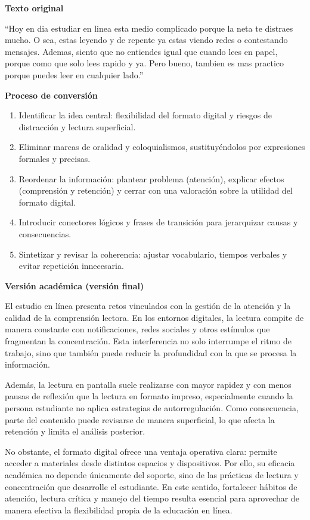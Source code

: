 \documentclass[
	spanish,
	letterpaper, oneside
]{article}
\begin{document}
\textbf{Texto original}

``Hoy en dia estudiar en linea esta medio complicado porque la neta te distraes mucho. O sea, estas leyendo y de repente ya estas viendo redes o contestando mensajes. Ademas, siento que no entiendes igual que cuando lees en papel, porque como que solo lees rapido y ya. Pero bueno, tambien es mas practico porque puedes leer en cualquier lado.''

\textbf{Proceso de conversi\'on}
\begin{enumerate}
	\item Identificar la idea central: flexibilidad del formato digital y riesgos de distracci\'on y lectura superficial.
	\item Eliminar marcas de oralidad y coloquialismos, sustituy\'endolos por expresiones formales y precisas.
	\item Reordenar la informaci\'on: plantear problema (atenci\'on), explicar efectos (comprensi\'on y retenci\'on) y cerrar con una valoraci\'on sobre la utilidad del formato digital.
	\item Introducir conectores l\'ogicos y frases de transici\'on para jerarquizar causas y consecuencias.
	\item Sintetizar y revisar la coherencia: ajustar vocabulario, tiempos verbales y evitar repetici\'on innecesaria.
\end{enumerate}

\textbf{Versi\'on acad\'emica (versi\'on final)}

El estudio en l\'inea presenta retos vinculados con la gesti\'on de la atenci\'on y la calidad de la comprensi\'on lectora. En los entornos digitales, la lectura compite de manera constante con notificaciones, redes sociales y otros est\'imulos que fragmentan la concentraci\'on. Esta interferencia no solo interrumpe el ritmo de trabajo, sino que tambi\'en puede reducir la profundidad con la que se procesa la informaci\'on.

Adem\'as, la lectura en pantalla suele realizarse con mayor rapidez y con menos pausas de reflexi\'on que la lectura en formato impreso, especialmente cuando la persona estudiante no aplica estrategias de autorregulaci\'on. Como consecuencia, parte del contenido puede revisarse de manera superficial, lo que afecta la retenci\'on y limita el an\'alisis posterior.

No obstante, el formato digital ofrece una ventaja operativa clara: permite acceder a materiales desde distintos espacios y dispositivos. Por ello, su eficacia acad\'emica no depende \'unicamente del soporte, sino de las pr\'acticas de lectura y concentraci\'on que desarrolle el estudiante. En este sentido, fortalecer h\'abitos de atenci\'on, lectura cr\'itica y manejo del tiempo resulta esencial para aprovechar de manera efectiva la flexibilidad propia de la educaci\'on en l\'inea.
\end{document}
